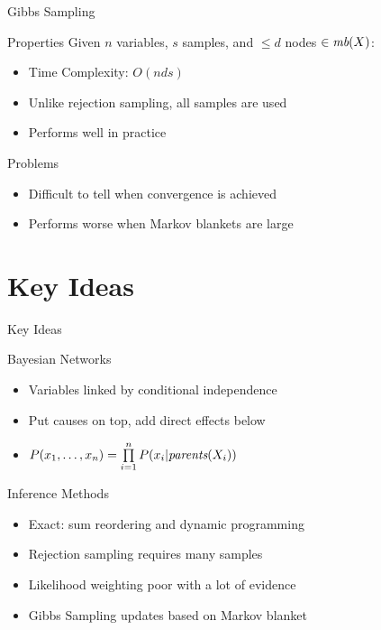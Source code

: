 \documentclass[12pt]{beamer}
\newcommand{\EM}[1]{\mbox{\em#1}}
\begin{document}
\begin{frame}{Gibbs Sampling}
	\begin{block}{Properties}
		Given $n$ variables, $s$ samples, and $\leq d$ nodes $\in \EM{mb}(X)$:
		\begin{itemize}
			\item Time Complexity: \pause $O(nds)$
			\pause
			\item Unlike rejection sampling, all samples are used
			\pause
			\item Performs well in practice
		\end{itemize}
	\end{block}
	\pause
	\begin{block}{Problems}
		\begin{itemize}
			\item Difficult to tell when convergence is achieved
			\item Performs worse when Markov blankets are large
		\end{itemize}
	\end{block}
\end{frame}


\part{Key Ideas}
\begin{frame}{Key Ideas}
	\begin{block}{Bayesian Networks}
		\begin{itemize}
			\item Variables linked by conditional independence
			\item Put causes on top, add direct effects below
			\item $P(x_{1},\ldots,x_{n}) = \prod\limits_{i=1}^{n}{P(x_{i}|\EM{parents}(X_{i}))}$
		\end{itemize}
	\end{block}
	\begin{block}{Inference Methods}
		\begin{itemize}
			\item Exact: sum reordering and dynamic programming
			\item Rejection sampling requires many samples
			\item Likelihood weighting poor with a lot of evidence
			\item Gibbs Sampling updates based on Markov blanket
		\end{itemize}
	\end{block}
\end{frame}
\end{document}
